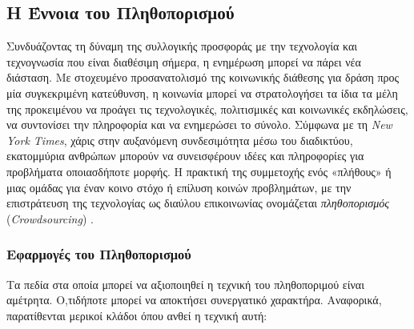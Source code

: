 \subsection{Η Έννοια του Πληθοπορισμού}
Συνδυάζοντας τη δύναμη της συλλογικής προσφοράς με την τεχνολογία και τεχνογνωσία που είναι διαθέσιμη σήμερα, η ενημέρωση μπορεί να πάρει νέα διάσταση. Με στοχευμένο προσανατολισμό της κοινωνικής διάθεσης για δράση προς μία συγκεκριμένη κατεύθυνση, η κοινωνία μπορεί να στρατολογήσει τα ίδια τα μέλη της προκειμένου να προάγει τις τεχνολογικές, πολιτισμικές και κοινωνικές εκδηλώσεις, να συντονίσει την πληροφορία και να ενημερώσει το σύνολο. Σύμφωνα με τη \textit{New York Times}, χάρις στην αυξανόμενη συνδεσιμότητα μέσω του διαδικτύου, εκατομμύρια ανθρώπων μπορούν να συνεισφέρουν ιδέες και πληροφορίες για προβλήματα οποιασδήποτε μορφής. Η πρακτική της συμμετοχής ενός «πλήθους» ή μιας ομάδας για έναν κοινο στόχο ή επίλυση κοινών προβλημάτων, με την επιστράτευση της τεχνολογίας ως διαύλου επικοινωνίας ονομάζεται \textit{πληθοπορισμός} (\textit{Crowdsourcing}) \cite{[CSW+18]}.

\subsubsection{Εφαρμογές του Πληθοπορισμού}
Τα πεδία στα οποία μπορεί να αξιοποιηθεί η τεχνική του πληθοποριμού είναι αμέτρητα. Ο,τιδήποτε μπορεί να αποκτήσει συνεργατικό χαρακτήρα. Αναφορικά, παρατίθενται μερικοί κλάδοι όπου ανθεί η τεχνική αυτή:
\begin{description}[font=$\bullet$~\normalfont\color{black}]
\item [Εκπαίδευση]
\item [Οικονομία]
\item [Επιστήμη και Υγεία]
\item [ΙΤ]
\item [Διαφήμιση]
\item [Επιχειρηματικότητα]
\item [Κοινωνικές Εκδηλώσεις και ΜΚΟ]
\end{description}


